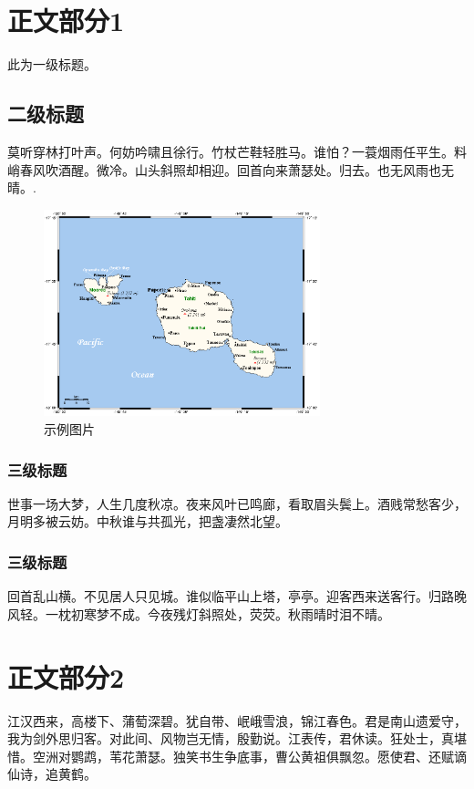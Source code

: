 \documentclass[12pt,journal,onecolumn]{IEEEtran}
\begin{document}
\section{正文部分1}

此为一级标题。

\subsection{二级标题}

莫听穿林打叶声。何妨吟啸且徐行。竹杖芒鞋轻胜马。谁怕？一蓑烟雨任平生。料峭春风吹酒醒。微冷。山头斜照却相迎。回首向来萧瑟处。归去。也无风雨也无晴。\cite{tahitiworldatlas}.

\begin{figure}[!h]
  \centering
  \includegraphics[height=6cm]{figures/TahitiMooreaMap.png}
  \caption{示例图片}
  \label{tmmap}
\end{figure}

\subsubsection{三级标题}

世事一场大梦，人生几度秋凉。夜来风叶已鸣廊，看取眉头鬓上。酒贱常愁客少，月明多被云妨。中秋谁与共孤光，把盏凄然北望。

\subsubsection{三级标题}

回首乱山横。不见居人只见城。谁似临平山上塔，亭亭。迎客西来送客行。归路晚风轻。一枕初寒梦不成。今夜残灯斜照处，荧荧。秋雨晴时泪不晴。

\section{正文部分2}

江汉西来，高楼下、蒲萄深碧。犹自带、岷峨雪浪，锦江春色。君是南山遗爱守，我为剑外思归客。对此间、风物岂无情，殷勤说。江表传，君休读。狂处士，真堪惜。空洲对鹦鹉，苇花萧瑟。独笑书生争底事，曹公黄祖俱飘忽。愿使君、还赋谪仙诗，追黄鹤。
\end{document}
